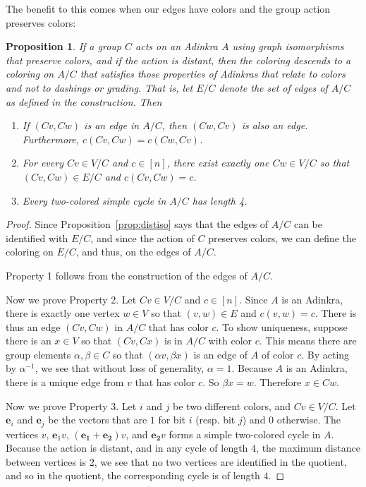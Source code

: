\documentclass[12pt,twoside,singlespace]{article}
\numberwithin{equation}{section}
\newtheorem{prop}[equation]{Proposition}
\theoremstyle{definition}
\renewcommand{\vec}[1]{\mathbf{#1}}
\begin{document}
The benefit to this comes when our edges have colors and the group action preserves colors:

\begin{prop}
\label{prop:quotient}
If a group $C$ acts on an Adinkra $A$ using graph isomorphisms that preserve colors, and if the action is distant, then the coloring descends to a coloring on $A/C$ that satisfies those properties of Adinkras that relate to colors and not to dashings or grading.  That is, let $E/C$ denote the set of edges of $A/C$ as defined in the construction.  Then
\begin{enumerate}
\item If $(Cv,Cw)$ is an edge in $A/C$, then $(Cw,Cv)$ is also an edge.  Furthermore, $c(Cv,Cw)=c(Cw,Cv)$.
\item For every $Cv\in V/C$ and $c\in [n]$, there exist exactly one $Cw\in V/C$ so that $(Cv,Cw)\in E/C$ and $c(Cv,Cw)=c$.
\item Every two-colored simple cycle in $A/C$ has length 4.
\end{enumerate}
\end{prop}
\begin{proof}
Since Proposition~\ref{prop:distiso} says that the edges of $A/C$ can be identified with $E/C$, and since the action of $C$ preserves colors, we can define the coloring on $E/C$, and thus, on the edges of $A/C$.

Property 1 follows from the construction of the edges of $A/C$.

Now we prove Property 2.  Let $Cv\in V/C$ and $c\in [n]$.  Since $A$ is an Adinkra, there is exactly one vertex $w\in V$ so that $(v,w)\in E$ and $c(v,w)=c$.  There is thus an edge $(Cv,Cw)$ in $A/C$ that has color $c$.  To show uniqueness, suppose there is an $x\in V$ so that $(Cv,Cx)$ is in $A/C$ with color $c$.  This means there are group elements $\alpha,\beta\in C$ so that $(\alpha v,\beta x)$ is an edge of $A$ of color $c$.  By acting by $\alpha^{-1}$, we see that without loss of generality, $\alpha=1$.  Because $A$ is an Adinkra, there is a unique edge from $v$ that has color $c$.  So $\beta x = w$.  Therefore $x\in Cw$.

Now we prove Property 3.  Let $i$ and $j$ be two different colors, and $Cv\in V/C$.  Let $\vec{e}_i$ and $\vec{e}_j$ be the vectors that are $1$ for bit $i$ (resp. bit $j$) and $0$ otherwise.  The vertices $v$, $\vec{e}_1 v$, $(\vec{e_1}+\vec{e_2})v$, and $\vec{e_2}v$ forms a simple two-colored cycle in $A$.  Because the action is distant, and in any cycle of length $4$, the maximum distance between vertices is $2$, we see that no two vertices are identified in the quotient, and so in the quotient, the corresponding cycle is of length $4$.
\end{proof}
\end{document}
